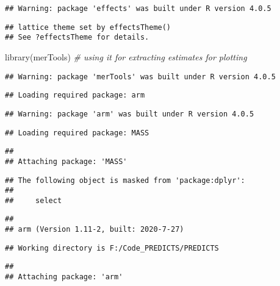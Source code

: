 \documentclass[
]{article}
\newenvironment{Shaded}{\begin{snugshade}}{\end{snugshade}}
\newcommand{\CommentTok}[1]{\textcolor[rgb]{0.56,0.35,0.01}{\textit{#1}}}
\newcommand{\FunctionTok}[1]{\textcolor[rgb]{0.00,0.00,0.00}{#1}}
\newcommand{\NormalTok}[1]{#1}
\begin{document}
\begin{verbatim}
## Warning: package 'effects' was built under R version 4.0.5
\end{verbatim}

\begin{verbatim}
## lattice theme set by effectsTheme()
## See ?effectsTheme for details.
\end{verbatim}

\begin{Shaded}
\begin{Highlighting}[]
\FunctionTok{library}\NormalTok{(merTools) }\CommentTok{\# using it for extracting estimates for plotting}
\end{Highlighting}
\end{Shaded}

\begin{verbatim}
## Warning: package 'merTools' was built under R version 4.0.5
\end{verbatim}

\begin{verbatim}
## Loading required package: arm
\end{verbatim}

\begin{verbatim}
## Warning: package 'arm' was built under R version 4.0.5
\end{verbatim}

\begin{verbatim}
## Loading required package: MASS
\end{verbatim}

\begin{verbatim}
## 
## Attaching package: 'MASS'
\end{verbatim}

\begin{verbatim}
## The following object is masked from 'package:dplyr':
## 
##     select
\end{verbatim}

\begin{verbatim}
## 
## arm (Version 1.11-2, built: 2020-7-27)
\end{verbatim}

\begin{verbatim}
## Working directory is F:/Code_PREDICTS/PREDICTS
\end{verbatim}

\begin{verbatim}
## 
## Attaching package: 'arm'
\end{verbatim}
\end{document}
